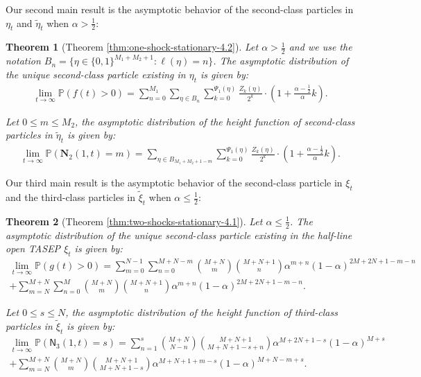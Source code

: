 \documentclass[12pt,a4paper]{amsart}
\newtheorem{theorem}{Theorem} %
\theoremstyle{remark}
\numberwithin{equation}{section} \numberwithin{theorem}{section}
\begin{document}
Our second main result is the asymptotic behavior of the second-class particles in $\eta_t$ and $\tilde{\eta}_{t}$ when $\alpha > \frac12$:

\begin{theorem}[Theorem \ref{thm:one-shock-stationary-4.2}]
Let $\alpha > \frac12$ and we use the notation $B_{n}=\{\eta \in \{0,1\}^{M_1+M_2+1}: \ell(\eta)=n\}$. The asymptotic distribution of the unique second-class particle existing in $\eta_t$ is given by:
\begin{align*}
\lim_{t \to \infty } \mathbb{P}(f(t)>0)=
\sum_{n=0}^{M_1}\sum_{\eta \in B_{n}}\sum_{k=0}^{\Psi_{1}(\eta)} \frac{Z_k(\eta)}{2^k} \cdot \left(1+\frac{\alpha-\frac12}{\alpha}k\right).
\end{align*}

Let $0 \leq m \leq M_2$, the asymptotic distribution  of the height function of second-class particles in $\tilde{\eta}_{t}$ is given by:
\begin{align*}
\lim_{t\to\infty}\mathbb{P}(\mathbf{N}_{2} (1,t)=m)
=\sum_{\eta \in B_{M_1+M_2+1-m}}\sum_{k=0}^{\Psi_{1}(\eta)} \frac{Z_k(\eta)}{2^k} \cdot \left(1+\frac{\alpha-\frac12}{\alpha}k\right).
\end{align*}
\end{theorem}

Our third main result is the asymptotic behavior of the second-class particle in $\xi_t$ and the third-class particles in $\tilde{\xi}_{t}$ when $ \alpha \leq \frac12$:
\begin{theorem}[Theorem \ref{thm:two-shocks-stationary-4.1}]
Let $ \alpha \leq \frac12$. The asymptotic distribution of the unique second-class particle existing in the half-line open TASEP $\xi_t$ is given by:
\begin{multline*}
\lim_{t\to\infty}\mathbb{P}(g(t)>0)=\sum_{m=0}^{N-1}\sum_{n=0}^{M+N-m}\binom{M+N}{m}\binom{M+N+1}{n}\alpha^{m+n}(1-\alpha)^{2M+2N+1-m-n}\\
+\sum_{m=N}^{M+N}\sum_{n=0}^{M}\binom{M+N}{m}\binom{M+N+1}{n}\alpha^{m+n}(1-\alpha)^{2M+2N+1-m-n}.
\end{multline*}

Let $0 \leq s \leq N$, the asymptotic distribution of the height function of third-class particles in $\tilde{\xi}_t$ is given by:
\begin{multline*}
\lim_{t\to\infty}\mathbb{P}(\mathsf{N}_{3} (1,t)=s)=\sum_{n=1}^{s}\binom{M+N}{N-n}\binom{M+N+1}{M+N+1-s+n}\alpha^{M+2N+1-s}(1-\alpha)^{M+s}\\
+\sum_{m=N}^{M+N}\binom{M+N}{m}\binom{M+N+1}{M+N+1-s}\alpha^{M+N+1+m-s}(1-\alpha)^{M+N-m+s}.
\end{multline*}
\end{theorem}
\end{document}
